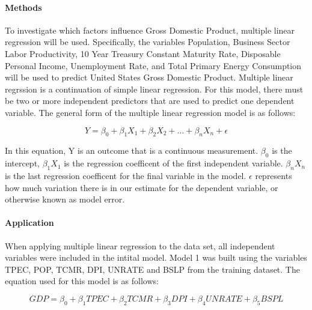 \documentclass[12pt]{article}
\begin{document}







\paragraph{Methods} 
To investigate which factors influence Gross Domestic Product, multiple linear regression will be used. 
Specifically, the variables Population, Business Sector Labor Productivity, 10 Year Treasury Constant Maturity Rate, Disposable Personal Income, Unemployment Rate, and Total Primary Energy Consumption will be used to predict United States Gross Domestic Product.
Multiple linear regrssion is a continuation of simple linear regression. 
For this model, there must be two or more independent predictors that are used to predict one dependent variable. 
The general form of the multiple linear regression model is as follows: 


\begin{equation}
  Y = \beta_0 + \beta_1 X_1 + \beta_2 X_2 + ... + \beta_n X_n + \epsilon
\end{equation}

In this equation, Y is an outcome that is a continuous measurement. $\beta_0$ is the intercept, $\beta_1 X_1$ is the regression coefficent of the first independent variable. 
$\beta_n X_n$ is the last regression coefficent for the final variable in the model.
$\epsilon$ represents how much variation there is in our estimate for the dependent variable, or otherwise known as model error. 


 






\paragraph{Application}

When applying multiple linear regression to the data set, all independent variables were included in the intital model.
Model 1 was built using the variables TPEC, POP, TCMR, DPI, UNRATE and BSLP from the training dataset. 
The equation used for this model is as follows:

\begin{equation}
  GDP = \beta_0 + \beta_1 TPEC + \beta_2 TCMR+ \beta_3 DPI + \beta_4 UNRATE + \beta_5 BSPL
\end{equation}
\end{document}

